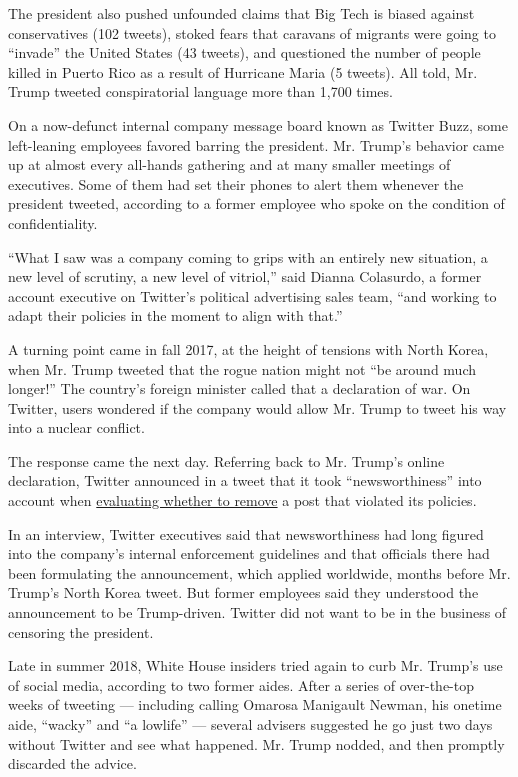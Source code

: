 The president also pushed unfounded claims that Big Tech is biased
against conservatives (102 tweets), stoked fears that caravans of
migrants were going to ``invade'' the United States (43 tweets), and
questioned the number of people killed in Puerto Rico as a result of
Hurricane Maria (5 tweets). All told, Mr. Trump tweeted conspiratorial
language more than 1,700 times.

On a now-defunct internal company message board known as Twitter Buzz,
some left-leaning employees favored barring the president. Mr. Trump's
behavior came up at almost every all-hands gathering and at many smaller
meetings of executives. Some of them had set their phones to alert them
whenever the president tweeted, according to a former employee who spoke
on the condition of confidentiality.

``What I saw was a company coming to grips with an entirely new
situation, a new level of scrutiny, a new level of vitriol,'' said
Dianna Colasurdo, a former account executive on Twitter's political
advertising sales team, ``and working to adapt their policies in the
moment to align with that.''

A turning point came in fall 2017, at the height of tensions with North
Korea, when Mr. Trump tweeted that the rogue nation might not ``be
around much longer!'' The country's foreign minister called that a
declaration of war. On Twitter, users wondered if the company would
allow Mr. Trump to tweet his way into a nuclear conflict.

The response came the next day. Referring back to Mr. Trump's online
declaration, Twitter announced in a tweet that it took
``newsworthiness'' into account when
\href{https://twitter.com/Policy/status/912438046515220480}{evaluating
whether to remove} a post that violated its policies.

In an interview, Twitter executives said that newsworthiness had long
figured into the company's internal enforcement guidelines and that
officials there had been formulating the announcement, which applied
worldwide, months before Mr. Trump's North Korea tweet. But former
employees said they understood the announcement to be Trump-driven.
Twitter did not want to be in the business of censoring the president.

Late in summer 2018, White House insiders tried again to curb Mr.
Trump's use of social media, according to two former aides. After a
series of over-the-top weeks of tweeting --- including calling Omarosa
Manigault Newman, his onetime aide, ``wacky'' and ``a lowlife'' ---
several advisers suggested he go just two days without Twitter and see
what happened. Mr. Trump nodded, and then promptly discarded the advice.

